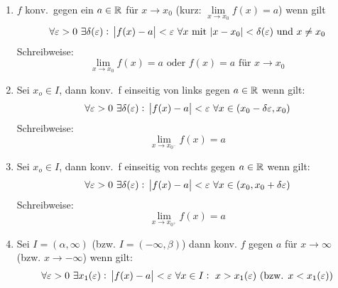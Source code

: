 \begin{enumerate}[label= (\alph*)]
    \item $f$ konv.\ gegen ein $a\in \mathbb{R}$ für $x \rightarrow x_0$
        (kurz: $\lim\limits_{x \rightarrow x_0} f(x)=a$) wenn gilt
        \begin{equation*}
            \forall \varepsilon > 0\ \exists \delta(\varepsilon):\
            \abs{f(x) - a} < \varepsilon\ \forall x \text{ mit }
            \abs{x- x_0} < \delta(\varepsilon) \text{ und } x \neq x_0
        \end{equation*}
        Schreibweise:
        \begin{equation*}
            \lim_{x \rightarrow x_0} f(x) = a
            \text{ oder } f(x)=a \text{ für } x \rightarrow x_0
        \end{equation*}
    \item Sei $x_o \in I$, dann konv.\ f einseitig von links
        gegen $a\in\mathbb{R}$ wenn gilt:
        \begin{equation*}
            \forall \varepsilon > 0\  \exists \delta(\varepsilon):\
            \abs{f(x) -a} < \varepsilon\ \forall x \in
            (x_0 - \delta{\varepsilon}, x_0)
         \end{equation*}
        Schreibweise:
        \begin{equation*}
            \lim_{x \rightarrow x_{0^-}} f(x) = a
        \end{equation*}
    \item Sei $x_o \in I$, dann konv.\ f einseitig von rechts
        gegen $a\in\mathbb{R}$ wenn gilt:
        \begin{equation*}
            \forall \varepsilon > 0\  \exists \delta(\varepsilon):\
            \abs{f(x) -a} < \varepsilon\ \forall x \in
            (x_0 , x_0 + \delta{\varepsilon})
         \end{equation*}
        Schreibweise:
        \begin{equation*}
            \lim_{x \rightarrow x_{0^+}} f(x) = a
        \end{equation*}
    \item Sei $I = (\alpha, \infty)$ (bzw. $I = (-\infty, \beta)$) dann
        konv. $f$ gegen $a$ für $x \rightarrow \infty$
        (bzw. $x \rightarrow -\infty$) wenn gilt:
        \begin{equation*}
            \forall \varepsilon > 0\ \exists x_1(\varepsilon):\
            \abs{f(x) - a}<\varepsilon\ \forall x \in I:\ x > x_1(\varepsilon)
            \text{ (bzw. } x < x_1(\varepsilon) \text{)}
        \end{equation*}
\end{enumerate}

